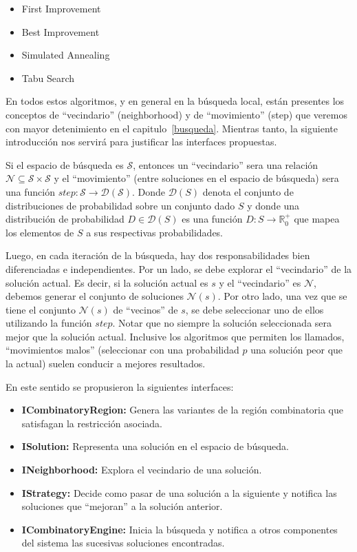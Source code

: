 \begin{itemize}
 \item First Improvement
 \item Best Improvement
 \item Simulated Annealing
 \item Tabu Search
\end{itemize}

En todos estos algoritmos, y en general en la b\'usqueda local, est\'an
presentes los conceptos de ``vecindario'' (neighborhood) y de ``movimiento''
(step) que veremos con mayor detenimiento en el capitulo~\ref{busqueda}.
Mientras tanto, la siguiente introducci\'on nos servir\'a para justificar
las interfaces propuestas.

Si el espacio de b\'usqueda es $\mathcal{S}$, entonces un ``vecindario'' sera
una relaci\'on $\mathcal{N} \subseteq \mathcal{S} \times \mathcal{S}$ y el
``movimiento'' (entre soluciones en el espacio de b\'usqueda) sera una funci\'on
$step: \mathcal{S} \rightarrow \mathcal{D}(\mathcal{S})$. Donde $\mathcal{D}(S)$
denota el conjunto de distribuciones de probabilidad sobre un conjunto dado $S$
y donde una distribuci\'on de probabilidad $D \in \mathcal{D}(S)$ es una
funci\'on $D:S \rightarrow \mathbb{R}^{+}_{0}$ que mapea los elementos de $S$ a
sus respectivas probabilidades.

Luego, en cada iteraci\'on de la b\'usqueda, hay dos responsabilidades bien
diferenciadas e independientes. Por un lado, se debe explorar el ``vecindario''
de la soluci\'on actual. Es decir, si la soluci\'on actual es $s$ y el
``vecindario'' es $\mathcal{N}$, debemos generar el conjunto de soluciones
$\mathcal{N}(s)$. Por otro lado, una vez que se tiene el conjunto
$\mathcal{N}(s)$ de ``vecinos'' de $s$, se debe seleccionar uno de ellos
utilizando la funci\'on $step$. Notar que no siempre la soluci\'on seleccionada
sera mejor que la soluci\'on actual. Inclusive los algoritmos que permiten los
llamados, ``movimientos malos'' (seleccionar con una probabilidad $p$ una
soluci\'on peor que la actual) suelen conducir a mejores resultados.

En este sentido se propusieron la siguientes interfaces:

\begin{itemize}
 \item \textbf{ICombinatoryRegion:} Genera las variantes de la regi\'on
combinatoria que satisfagan la restricci\'on asociada.
 \item \textbf{ISolution:} Representa una soluci\'on en el espacio de
b\'usqueda.
 \item \textbf{INeighborhood:} Explora el vecindario de una soluci\'on.
 \item \textbf{IStrategy:} Decide como pasar de una soluci\'on a la siguiente y
notifica las soluciones que ``mejoran'' a la soluci\'on anterior.
 \item \textbf{ICombinatoryEngine:} Inicia la b\'usqueda y notifica a otros
componentes del sistema las sucesivas soluciones encontradas.
\end{itemize}

